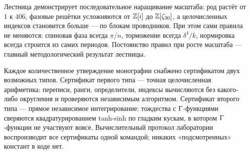 Лестница демонстрирует последовательное наращивание масштаба: род растёт
от $1$ к $406$, фазовые решётки усложняются от $\mathbb{Z}[i]$ до
$\mathbb{Z}[\zeta_{30}]$, а целочисленных индексов становится больше — по блокам
проводников. При этом сами правила не меняются: спиновая фаза всегда
$\pi/n$, торможение всегда $\delta^4/k$, нормировка всегда строится из
самих периодов. Постоянство правил при росте масштаба — главный
методологический результат лестницы.

\begin{remark}
Каждое количественное утверждение монографии снабжено сертификатом двух
возможных типов. Сертификат первого типа — точная целочисленная
арифметика: переписи, ранги, определители, индексы вычисляются без
какого-либо округления и проверяются независимым алгоритмом. Сертификат
второго типа — прямое независимое интегрирование: тождества с
$\Gamma$-функциями сверяются квадратурированием tanh-sinh по гладким
кускам, в котором $\Gamma$-функции не участвуют вовсе. Вычислительный
протокол лаборатории воспроизводит все сертификаты одной командой;
никаких «подсмотренных» констант в коде нет.
\end{remark}
